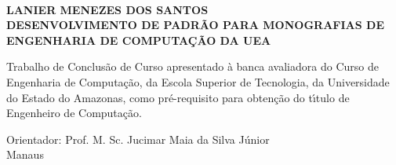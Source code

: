 \thispagestyle{empty}
\begin{center}
	\textbf{\\[4em]LANIER MENEZES DOS SANTOS \\[5cm]}
	\textbf{DESENVOLVIMENTO DE PADR\~{A}O PARA MONOGRAFIAS DE ENGENHARIA DE COMPUTA\c{C}\~{A}O DA UEA\\[96pt]}
\end{center}
\hspace*{8cm}
\begin{minipage}{8cm} 
	Trabalho de Conclus\~{a}o de Curso apresentado \`{a} banca avaliadora do Curso de Engenharia de Computa\c{c}\~{a}o, da 
	Escola Superior de Tecnologia, da Universidade do Estado do Amazonas, como
	pr\'e-requisito para obten\c{c}\~{a}o do t\'{\i}tulo de Engenheiro de Computa\c{c}\~{a}o.\\[50pt] 
\end{minipage} 
\begin{center}
	Orientador: Prof. M. Sc. Jucimar Maia da Silva J\'{u}nior\\[4ex]
	\normal Manaus\\
\end{center}